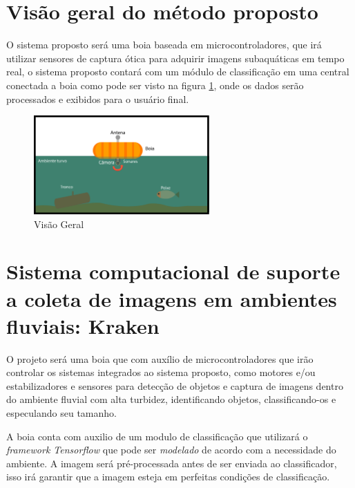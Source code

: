\section{Visão geral do método proposto}
   
   O sistema proposto será uma boia baseada em microcontroladores, que irá utilizar sensores de captura ótica para adquirir imagens subaquáticas em tempo real, o sistema proposto contará com um módulo de classificação em uma central conectada a boia como pode ser visto na figura \ref{fig:bigpic}, onde os dados serão processados e exibidos para o usuário final. 
   

\begin{figure}[ht]
	\centering
    \caption{\label{fig:bigpic}Visão Geral}
	\includegraphics[width = 0.6\textwidth]{resources/Bigpicture}
\end{figure}

\section{Sistema computacional de suporte a coleta de imagens em ambientes fluviais: Kraken}

O projeto será uma boia que com auxílio de microcontroladores que irão controlar os sistemas integrados ao sistema proposto, como motores e/ou estabilizadores e sensores para detecção de objetos e captura de imagens dentro do ambiente fluvial com alta turbidez, identificando objetos, classificando-os e especulando seu tamanho.

A boia conta com auxilio de um modulo de classificação que utilizará o \textit{framework Tensorflow} que pode ser \textit{modelado} de acordo com a necessidade do ambiente. A imagem será pré-processada antes de ser enviada ao classificador, isso irá garantir que a imagem esteja em perfeitas condições de classificação.

